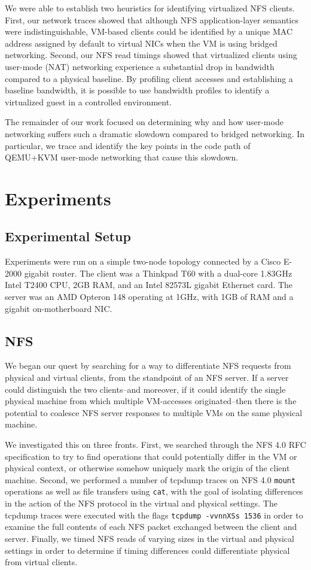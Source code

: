 \documentclass[11pt,pdftex,twocolumn]{article}
\begin{document}
We were able to establish two heuristics for identifying virtualized NFS clients. First, our network traces showed that although NFS application-layer semantics were indistinguishable, VM-based clients could be identified by a unique MAC address assigned by default to virtual NICs when the VM is using bridged networking. Second, our NFS read timings showed that virtualized clients using user-mode (NAT) networking experience a substantial drop in bandwidth compared to a physical baseline. By profiling client accesses and establishing a baseline bandwidth, it is possible to use bandwidth profiles to identify a virtualized guest in a controlled environment.

The remainder of our work focused on determining why and how user-mode networking suffers such a dramatic slowdown compared to bridged networking. In particular, we trace and identify the key points in the code path of QEMU+KVM user-mode networking that cause this slowdown.

\section{Experiments}

\subsection{Experimental Setup}
Experiments were run on a simple two-node topology connected by a Cisco E-2000 gigabit router. The client was a Thinkpad T60 with a dual-core 1.83GHz Intel T2400 CPU, 2GB RAM, and an Intel 82573L gigabit Ethernet card. The server was an AMD Opteron 148 operating at 1GHz, with 1GB of RAM and a gigabit on-motherboard NIC. 

\subsection{NFS}
We began our quest by searching for a way to differentiate NFS requests from physical and virtual clients, from the standpoint of an NFS server. If a server could distinguish the two clients--and moreover, if it could identify the single physical machine from which multiple VM-accesses originated--then there is the potential to coalesce NFS server responses to multiple VMs on the same physical machine. 

We investigated this on three fronts. First, we searched through the NFS 4.0 RFC specification to try to find operations that could potentially differ in the VM or physical context, or otherwise somehow uniquely mark the origin of the client machine. Second, we performed a number of tcpdump traces on NFS 4.0 \texttt{mount} operations as well as file transfers using \texttt{cat}, with the goal of isolating differences in the action of the NFS protocol in the virtual and physical settings. The tcpdump traces were executed with the flags \texttt{tcpdump -vvnnXSs 1536} in order to examine the full contents of each NFS packet exchanged between the client and server. Finally, we timed NFS reads of varying sizes in the virtual and physical settings in order to determine if timing differences could differentiate physical from virtual clients. 
\end{document}
